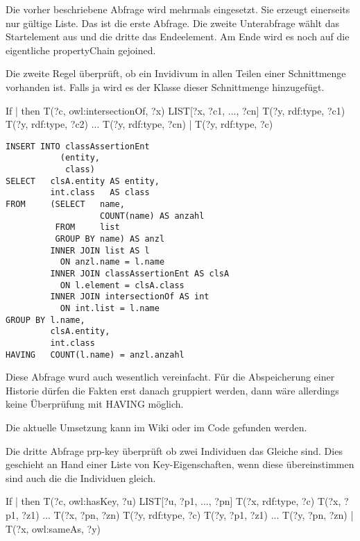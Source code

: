 Die vorher beschriebene Abfrage wird mehrmals eingesetzt. Sie erzeugt einerseits nur gültige Liste. Das ist die erste Abfrage. Die zweite Unterabfrage wählt das Startelement aus und die dritte das Endeelement. Am Ende wird es noch auf die eigentliche propertyChain gejoined.

Die zweite Regel überprüft, ob ein Invidivum in allen Teilen einer Schnittmenge vorhanden ist. Falls ja wird es der Klasse dieser Schnittmenge hinzugefügt.

If | then
T(?c, owl:intersectionOf, ?x)
LIST[?x, ?c1, ..., ?cn]
T(?y, rdf:type, ?c1)
T(?y, rdf:type, ?c2)
...
T(?y, rdf:type, ?cn) 	             | T(?y, rdf:type, ?c) 	 

\begin{lstlisting}
INSERT INTO classAssertionEnt
           (entity,
            class)
SELECT   clsA.entity AS entity,
         int.class   AS class
FROM     (SELECT   name,
                   COUNT(name) AS anzahl
          FROM     list
          GROUP BY name) AS anzl
         INNER JOIN list AS l
           ON anzl.name = l.name
         INNER JOIN classAssertionEnt AS clsA
           ON l.element = clsA.class
         INNER JOIN intersectionOf AS int
           ON int.list = l.name
GROUP BY l.name,
         clsA.entity,
         int.class
HAVING   COUNT(l.name) = anzl.anzahl
\end{lstlisting}

Diese Abfrage wurd auch wesentlich vereinfacht. Für die Abspeicherung einer Historie dürfen die Fakten erst danach gruppiert werden, dann wäre allerdings keine Überprüfung mit HAVING möglich.

Die aktuelle Umsetzung kann im Wiki oder im Code gefunden werden.

Die dritte Abfrage prp-key überprüft ob zwei Individuen das Gleiche sind. Dies geschieht an Hand einer Liste  von Key-Eigenschaften, wenn diese übereinstimmen sind auch die die Individuen gleich.

If | then
T(?c, owl:hasKey, ?u)
LIST[?u, ?p1, ..., ?pn]
T(?x, rdf:type, ?c)
T(?x, ?p1, ?z1)
...
T(?x, ?pn, ?zn)
T(?y, rdf:type, ?c)
T(?y, ?p1, ?z1)
...
T(?y, ?pn, ?zn) 	                 | T(?x, owl:sameAs, ?y)

